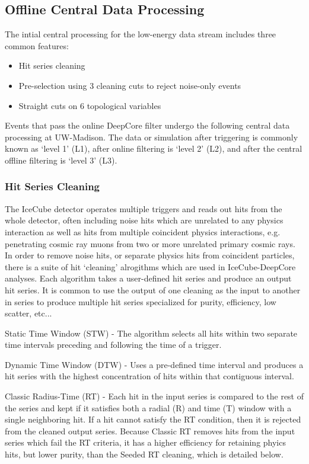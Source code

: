 \documentclass[../Main.tex]{subfiles}
\begin{document}
\subsection{Offline Central Data Processing}\label{sec:L3Filter}

The intial central processing for the low-energy data stream
includes three common features:
\begin{itemize}
\item{Hit series cleaning}
\item{Pre-selection using 3 cleaning cuts to reject noise-only events}
\item{Straight cuts on 6 topological variables}
\end{itemize}

Events that pass the online DeepCore filter undergo the following
central data processing at UW-Madison. The data or simulation after
triggering is commonly known as `level 1' (L1), after online filtering is
`level 2' (L2), and after the central offline filtering is `level 3'
(L3).

\subsubsection{Hit Series Cleaning}\label{sec:HitSeriesCleaning}

The IceCube detector operates multiple triggers and reads out hits
from the whole detector, often including noise hits which are
unrelated to any physics interaction as well as hits from multiple
coincident physics interactions, e.g. penetrating cosmic ray muons
from two or more unrelated primary cosmic rays. In order to remove noise
hits, or separate physics hits from coincident particles, there is a suite of
hit `cleaning' alrogithms which are used in IceCube-DeepCore
analyses. Each algorithm takes a user-defined hit series and produce an
output hit series. It is common to use the output of one cleaning as
the input to another in series to produce multiple hit series
specialized for purity, efficiency, low scatter, etc...

Static Time Window (STW) - The algorithm selects all hits
within two separate time intervals preceding and following the time of
a trigger.

Dynamic Time Window (DTW) - Uses a pre-defined time interval
and produces a hit series with the highest concentration of hits
within that contiguous interval.

Classic Radius-Time (RT) - Each hit in the input series is compared to the rest of
the series and kept if it satisfies both a radial (R) and time (T)
window with a single neighboring hit. If a hit cannot satisfy the RT
condition, then it is rejected from the cleaned output
series. Because Classic RT removes hits from the input series which
fail the RT criteria, it has a higher efficiency for retaining phyics hits, but lower purity,
than the Seeded RT cleaning, which is detailed below. 
\end{document}
